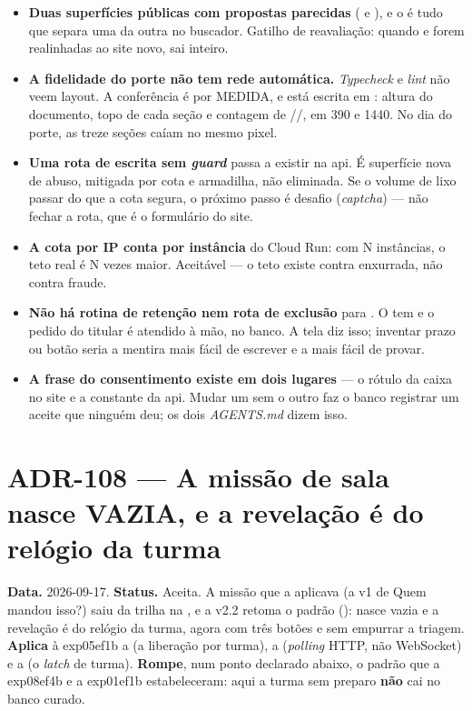 \begin{itemize}
  \item \textbf{Duas superfícies públicas com propostas parecidas} (\cd{/} e
    ), e o  é tudo que separa uma da outra no
    buscador. Gatilho de reavaliação: quando  e 
    forem realinhadas ao site novo,  sai inteiro.
  \item \textbf{A fidelidade do porte não tem rede automática.} \emph{Typecheck}
    e \emph{lint} não veem layout. A conferência é por MEDIDA, e está escrita em
    : altura do documento, topo de cada seção e
    contagem de //, em \num{390} e \num{1440}.
    No dia do porte, as treze seções caíam no mesmo pixel.
  \item \textbf{Uma rota de escrita sem \emph{guard}} passa a existir na api. É
    superfície nova de abuso, mitigada por cota e armadilha, não eliminada. Se o
    volume de lixo passar do que a cota segura, o próximo passo é desafio
    (\emph{captcha}) --- não fechar a rota, que é o formulário do site.
  \item \textbf{A cota por IP conta por instância} do Cloud Run: com N
    instâncias, o teto real é N vezes maior. Aceitável --- o teto existe contra
    enxurrada, não contra fraude.
  \item \textbf{Não há rotina de retenção nem rota de exclusão} para
    . O  tem  e o pedido do titular
    é atendido à mão, no banco. A tela diz isso; inventar prazo ou botão seria a
    mentira mais fácil de escrever e a mais fácil de provar.
  \item \textbf{A frase do consentimento existe em dois lugares} --- o rótulo da
    caixa no site e a constante da api. Mudar um sem o outro faz o banco
    registrar um aceite que ninguém deu; os dois \emph{AGENTS.md} dizem isso.
\end{itemize}

\section{ADR-108 --- A missão de sala nasce VAZIA, e a revelação é do relógio da turma}
\label{adr:exp05ef1b-sala-sincronizada}

\textbf{Data.} 2026-09-17. \textbf{Status.} Aceita. A missão que a aplicava (a
v1 de Quem mandou isso?) saiu da trilha na , e a v2.2 retoma o
padrão (): nasce vazia e a revelação é do relógio da turma, agora
com três botões e sem empurrar a triagem.
\textbf{Aplica} à exp05ef1b a  (a liberação por turma), a
 (\emph{polling} HTTP, não WebSocket) e a  (o
\emph{latch} de turma). \textbf{Rompe}, num ponto declarado abaixo, o padrão que
a exp08ef4b e a exp01ef1b estabeleceram: aqui a turma sem preparo \textbf{não} cai no
banco curado.

